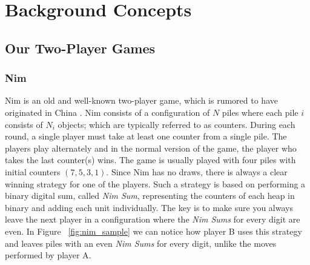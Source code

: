 \section{Background Concepts}
\label{back_con}

\subsection{Our Two-Player Games}
\label{gameDescriptions}

\subsubsection{Nim}
\label{nim}

Nim is an old and well-known two-player game, which is rumored to have originated in China \citep{bouton1901nim}. Nim consists of a configuration of $N$ piles where each pile $i$ consists of $N_i$ objects; which are typically referred to as counters. During each round, a single player must take at least one counter from a single pile. The players play alternately and in the normal version of the game, the player who takes the last counter(s) wins. The game is usually played with four piles with initial counters $(7,5,3,1)$.
Since Nim has no draws, there is always a clear winning strategy for one of the players. Such a strategy is based on performing a binary digital sum, called \textit{Nim Sum}, representing the counters of each heap in binary and adding each unit individually. The key is to make sure you always leave the next player in a configuration where the \textit{Nim Sums} for every digit are even. In Figure ~\ref{fig:nim_sample} we can notice how player B uses this strategy and leaves piles with an even \textit{Nim Sums} for every digit, unlike the moves performed by player A.

